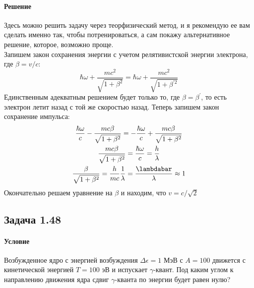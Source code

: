 \documentclass[12pt]{article}
\begin{document}
\paragraph{Решение}
Здесь можно решить задачу через теорфизический метод, и я рекомендую ее вам сделать именно так, чтобы потренироваться, а сам покажу альтернативное решение, которое, возможно проще.\\
Запишем закон сохранения энергии с учетом релятивистской энергии электрона, где $\beta = v/c$:
\begin{equation*}
    \hbar\omega + \dfrac{mc^2}{\sqrt{1+\beta^2}}=\hbar\omega + \dfrac{mc^2}{\sqrt{1+\beta^{'2}}}
\end{equation*}
Единственным адекватным решением будет только то, где $\beta = \beta^'$, то есть электрон летит назад с той же скоростью назад.  Теперь запишем закон сохранение импульса:
\begin{gather*}
    \dfrac{\hbar\omega}{c} - \dfrac{mc\beta}{\sqrt{1+\beta^2}} = -\dfrac{\hbar\omega}{c} + \dfrac{mc\beta}{\sqrt{1+\beta^2}}\\
     \dfrac{mc\beta}{\sqrt{1+\beta^2}} = \dfrac{\hbar\omega}{c} = \dfrac{h}{\lambda}\\
     \dfrac{\beta}{\sqrt{1+\beta^2}} = \dfrac{h}{mc}\dfrac{1}{\lambda} = \dfrac{\lambdabar}{\lambda}\approx 1\\
\end{gather*}
Окончательно решаем уравнение на $\beta$ и находим, что $v = c/\sqrt{2}$
\subsection{Задача 1.48}
\label{task_148}
\paragraph{Условие}Возбужденное ядро с энергией возбуждения $\Delta \epsilon = 1 $ МэВ с $A = 100$ движется с кинетической энергией $T = 100$ эВ и испускает $\gamma$-квант. Под каким углом к направлению движения ядра сдвиг $\gamma$-кванта по энергии будет равен нулю?
\end{document}
